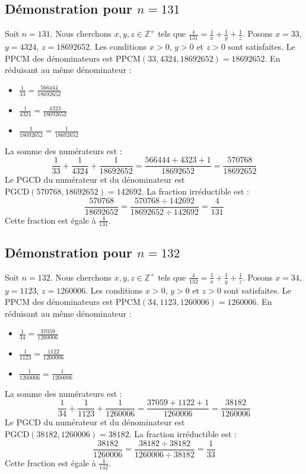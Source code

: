\documentclass[11pt,a4paper]{article}
\begin{document}
\subsection{Démonstration pour $n = 131$}
Soit $n = 131$. Nous cherchons $x, y, z \in \mathbb{Z}^{+}$ tels que $\frac{4}{131} = \frac{1}{x} + \frac{1}{y} + \frac{1}{z}$.
Posons $x = 33$, $y = 4324$, $z = 18692652$.
Les conditions $x > 0$, $y > 0$ et $z > 0$ sont satisfaites.
Le PPCM des dénominateurs est $\text{PPCM}(33, 4324, 18692652) = 18692652$.
En réduisant au même dénominateur :
\begin{itemize}
    \item $\frac{1}{33} = \frac{566444}{18692652}$
    \item $\frac{1}{4324} = \frac{4323}{18692652}$
    \item $\frac{1}{18692652} = \frac{1}{18692652}$
\end{itemize}
La somme des numérateurs est :
$$ \frac{1}{33} + \frac{1}{4324} + \frac{1}{18692652} = \frac{566444 + 4323 + 1}{18692652} = \frac{570768}{18692652} $$
Le PGCD du numérateur et du dénominateur est $\text{PGCD}(570768, 18692652) = 142692$.
La fraction irréductible est :
$$ \frac{570768}{18692652} = \frac{570768 \div 142692}{18692652 \div 142692} = \frac{4}{131} $$
Cette fraction est égale à $\frac{4}{131}$.

\subsection{Démonstration pour $n = 132$}
Soit $n = 132$. Nous cherchons $x, y, z \in \mathbb{Z}^{+}$ tels que $\frac{4}{132} = \frac{1}{x} + \frac{1}{y} + \frac{1}{z}$.
Posons $x = 34$, $y = 1123$, $z = 1260006$.
Les conditions $x > 0$, $y > 0$ et $z > 0$ sont satisfaites.
Le PPCM des dénominateurs est $\text{PPCM}(34, 1123, 1260006) = 1260006$.
En réduisant au même dénominateur :
\begin{itemize}
    \item $\frac{1}{34} = \frac{37059}{1260006}$
    \item $\frac{1}{1123} = \frac{1122}{1260006}$
    \item $\frac{1}{1260006} = \frac{1}{1260006}$
\end{itemize}
La somme des numérateurs est :
$$ \frac{1}{34} + \frac{1}{1123} + \frac{1}{1260006} = \frac{37059 + 1122 + 1}{1260006} = \frac{38182}{1260006} $$
Le PGCD du numérateur et du dénominateur est $\text{PGCD}(38182, 1260006) = 38182$.
La fraction irréductible est :
$$ \frac{38182}{1260006} = \frac{38182 \div 38182}{1260006 \div 38182} = \frac{1}{33} $$
Cette fraction est égale à $\frac{4}{132}$.
\end{document}
